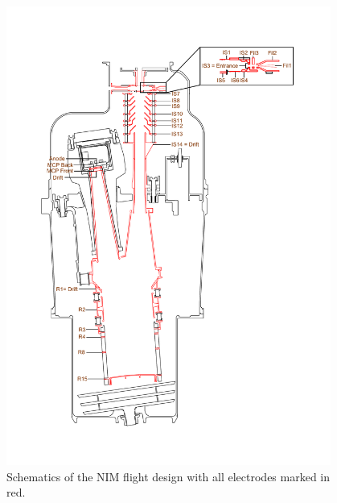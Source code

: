 	\begin{figure}[h!]
		\centering
		\includegraphics[width= 0.95\textwidth]{Setup/NIM_schema.pdf}
		\caption{Schematics of the NIM flight design with all electrodes marked in red.}
		\label{fig:MINPFMTot}
	\end{figure}
